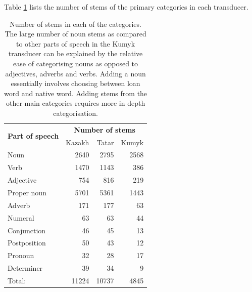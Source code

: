 \documentclass[a4paper,11pt,twocolumn]{article}
\begin{document}

Table \ref{table:stems} lists the number of stems of the primary categories in each transducer.

\begin{table}
\begin{center}
\begin{tabular}{lrrr}
		\toprule
\multirow{2}{*}{\textbf{Part of speech}} & \multicolumn{3}{c}{\textbf{Number of stems}} \\ \cline{2-4}
                        & Kazakh & Tatar & Kumyk \\
		\midrule
		Noun & 2640 & 2795 & 2568 \\
		Verb & 1470 & 1143 & 386 \\
		Adjective & 754 & 816 & 219 \\
		Proper noun & 5701 & 5361 & 1443 \\
		Adverb & 171 & 177 & 63 \\
		Numeral & 63 & 63 & 44 \\
		Conjunction & 46 & 45 & 13 \\
		Postposition & 50 & 43 & 12 \\
		Pronoun & 32 & 28 & 17 \\
		Determiner & 39 & 34 & 9 \\
		\midrule
		Total: & 11224 & 10737 & 4845 \\
		\bottomrule
\end{tabular}
 \caption{Number of stems in each of the categories. The large number of noun stems as compared
    to other parts of speech in the Kumyk transducer can be explained by the relative ease of 
    categorising nouns as opposed to adjectives, adverbs and verbs. Adding a noun essentially involves
    choosing between loan word and native word. Adding stems from the other main categories 
    requires more in depth categorisation.}
 \label{table:stems}
\end{center}

\end{table}

\end{document}
